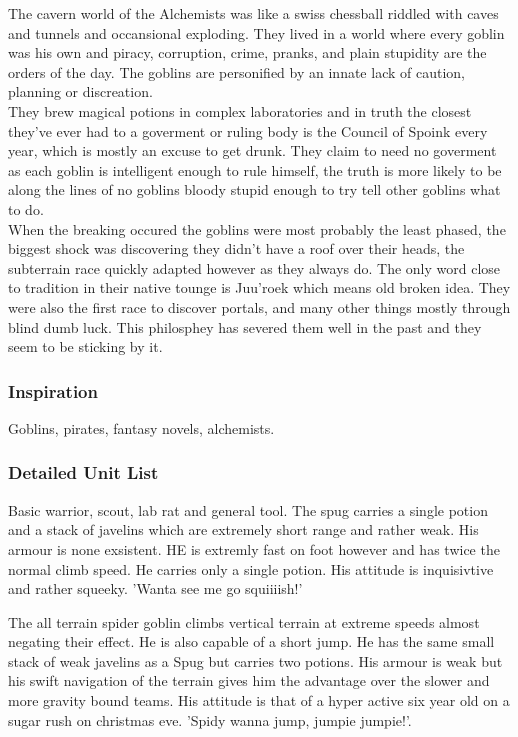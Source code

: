 \documentclass[a4paper,twocolumn]{article}
\begin{document}
The cavern world of the Alchemists was like a swiss chessball riddled with caves and tunnels and occansional exploding. They lived in a world where every goblin was his own and piracy, corruption, crime, pranks, and plain stupidity are the orders of the day. The goblins are personified by an innate lack of caution, planning or discreation.\\
They brew magical potions in complex laboratories and in truth the closest they've ever had to a goverment or ruling body is the Council of Spoink every year, which is mostly an excuse to get drunk. They claim to need no goverment as each goblin is intelligent enough to rule himself, the truth is more likely to be along the lines of no goblins bloody stupid enough to try tell other goblins what to do.\\
When the breaking occured the goblins were most probably the least phased, the biggest shock was discovering they didn't have a roof over their heads, the subterrain race quickly adapted however as they always do. The only word close to tradition in their native tounge is Juu'roek which means old broken idea. They were also the first race to discover portals, and many other things mostly through blind dumb luck. This philosphey has severed them well in the past and they seem to be sticking by it.

\subsubsection{Inspiration}

Goblins, pirates, fantasy novels, alchemists.

\subsubsection{Detailed Unit List}

Basic warrior, scout, lab rat and general tool. The spug carries a single potion and a stack of javelins which are extremely short range and rather weak. His armour is none exsistent. HE is extremly fast on foot however and has twice the normal climb speed. He carries only a single potion. His attitude is inquisivtive and rather squeeky. 'Wanta see me go squiiiish!'

The all terrain spider goblin climbs vertical terrain at extreme speeds almost negating their effect. He is also capable of a short jump. He has the same small stack of weak javelins as a Spug but carries two potions. His armour is weak but his swift navigation of the terrain gives him the advantage over the slower and more gravity bound teams. His attitude is that of a hyper active six year old on a sugar rush on christmas eve. 'Spidy wanna jump, jumpie jumpie!'.
\end{document}
